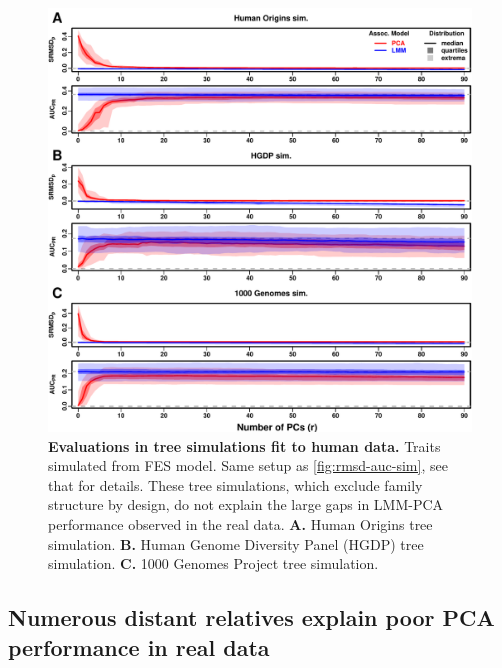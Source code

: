 \documentclass[11pt]{article}
\begin{document}
\begin{figure}[bp!]
  \centering
  \includegraphics[width=\textwidth,height=\textheight,keepaspectratio]{fes/rmsd-auc-real-sim.pdf}
  \caption{
    {\small 
      {\bf Evaluations in tree simulations fit to human data.}
      Traits simulated from FES model.
      Same setup as \cref{fig:rmsd-auc-sim}, see that for details.
      These tree simulations, which exclude family structure by design, do not explain the large gaps in LMM-PCA performance observed in the real data.
      \textbf{A.}
      Human Origins tree simulation.
      \textbf{B.}
      Human Genome Diversity Panel (HGDP) tree simulation.
      \textbf{C.}
      1000 Genomes Project tree simulation.
    }
  }
  \label{fig:rmsd-auc-real-sim}
\end{figure}

\subsection{Numerous distant relatives explain poor PCA performance in real data}
\end{document}

